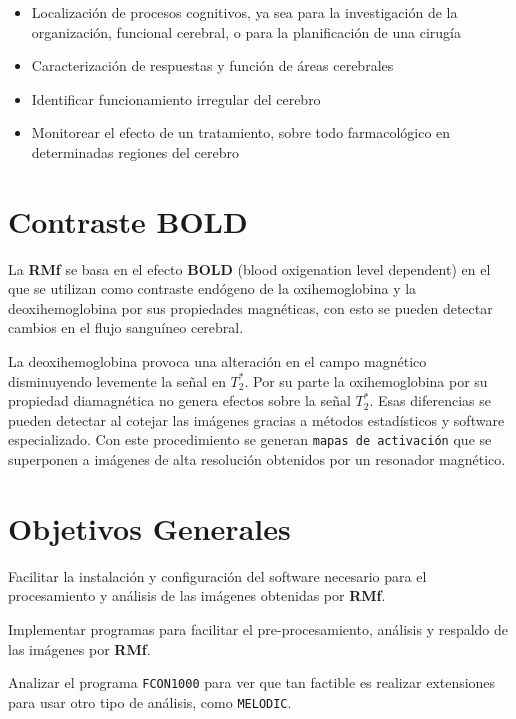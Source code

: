 \documentclass{article}
\begin{document}
\begin{itemize}
\item Localización de procesos cognitivos, ya sea para la investigación de la organización, funcional cerebral, o para la planificación de una cirugía
\item Caracterización de respuestas y función de áreas cerebrales
\item Identificar funcionamiento irregular del cerebro
\item Monitorear el efecto de un tratamiento, sobre todo farmacológico en determinadas regiones del cerebro
\end{itemize}

\section{Contraste BOLD}
La \textbf{RMf} se basa en el efecto \textbf{BOLD} (blood oxigenation level dependent) en el que se utilizan como contraste endógeno de la oxihemoglobina y la deoxihemoglobina por sus propiedades magnéticas, con esto se pueden detectar cambios en el flujo sanguíneo cerebral. %

La deoxihemoglobina provoca una alteración en el campo magnético disminuyendo levemente la señal en $T_2^*$. Por su parte la oxihemoglobina por su propiedad diamagnética no genera efectos sobre la señal $T_2^*$. Esas diferencias se pueden detectar al cotejar las imágenes gracias a métodos estadísticos y software especializado. Con este procedimiento se generan \texttt{mapas de activación} que se superponen a imágenes de alta resolución obtenidos por un resonador magnético.


\section{Objetivos Generales}

Facilitar la instalación y configuración del software necesario para el procesamiento y análisis de las imágenes obtenidas por \textbf{RMf}.

Implementar programas para facilitar el pre-procesamiento, análisis y respaldo de las imágenes por \textbf{RMf}.

Analizar el programa \texttt{FCON1000} para ver que tan factible es realizar extensiones para usar otro tipo de análisis, como \texttt{MELODIC}.
\end{document}
